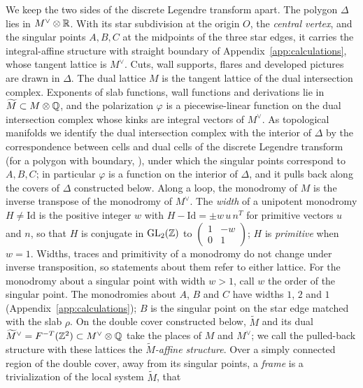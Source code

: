 We keep the two sides of the discrete Legendre transform apart.  The polygon
$\Delta$ lies in $M^\vee\otimes\mathbb R$.  With its star subdivision at
the origin $O$, the \emph{central vertex}, and the singular points $A,B,C$ at
the midpoints of the three
star edges, it carries the integral-affine structure with straight boundary
of Appendix~\ref{app:calculations}, whose tangent lattice is
$M^\vee$.  Cuts, wall supports, flares and developed pictures are
drawn in $\Delta$.  The dual lattice $M$ is the tangent lattice of the
dual intersection complex.  Exponents of slab
functions, wall functions and derivations lie in $\widetilde M\subset
M\otimes\mathbb Q$, and the polarization $\varphi$ is a piecewise-linear function
on the dual intersection complex whose kinks are integral vectors of
$M^\vee$.  As topological manifolds we identify the dual intersection
complex with the interior of $\Delta$ by the correspondence between cells and
dual cells of the discrete Legendre transform
\cite[\S1.4]{grosssiebert2006} (for a polygon with boundary,
\cite[\S7.1]{carletal2024}), under which the singular points correspond
to $A,B,C$; in particular $\varphi$ is a function on the interior of
$\Delta$, and it pulls back along the covers of $\Delta$ constructed below.
Along a loop, the monodromy of $M$ is the inverse
transpose of the monodromy of $M^\vee$.  The \emph{width} of a
unipotent monodromy $H\neq\mathrm{Id}$ is the positive integer $w$ with
$H-\mathrm{Id}=\pm w\,u\,n^T$ for primitive vectors $u$ and $n$, so that $H$
is conjugate in $\mathrm{GL}_2(\mathbb Z)$ to
$\left(\begin{smallmatrix}1&-w\\0&1\end{smallmatrix}\right)$; $H$ is
\emph{primitive} when $w=1$.  Widths, traces and
primitivity of a monodromy do not change under inverse transposition, so
statements about them refer to either lattice.  For the monodromy about a
singular point with width $w>1$, \cite[\S8.1]{carletal2024} call $w$ the
order of the singular point.  The monodromies about $A$, $B$
and $C$ have widths $1$, $2$ and $1$ (Appendix~\ref{app:calculations});
$B$ is the singular point on the star edge matched with the slab $\rho$.
On the double cover
constructed below, $\widetilde M$ and its dual
$\widetilde M^\vee=F^{-T}(\mathbb Z^2)\subset M^\vee\otimes\mathbb Q$ take the
places of $M$ and $M^\vee$; we call the pulled-back structure with
these lattices the \emph{$\widetilde M$-affine structure}.  Over a simply
connected region of the double cover, away from its singular points, a
\emph{frame} is a trivialization of the local system $\widetilde M$, that
